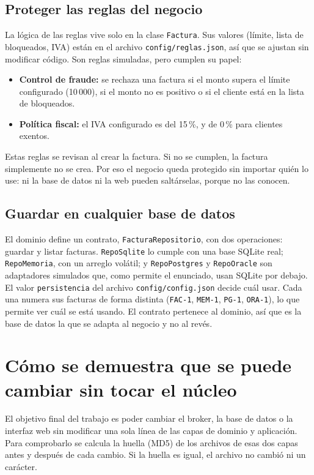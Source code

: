 \documentclass[10.5pt]{article}
\begin{document}
\subsection{Proteger las reglas del negocio}
La lógica de las reglas vive solo en la clase \texttt{Factura}. Sus valores (límite, lista de
bloqueados, IVA) están en el archivo \texttt{config/reglas.json}, así que se ajustan sin
modificar código. Son reglas simuladas, pero cumplen su papel:
\begin{itemize}
\item \textbf{Control de fraude:} se rechaza una factura si el monto supera el límite configurado (10\,000), si el
monto no es positivo o si el cliente está en la lista de bloqueados.
\item \textbf{Política fiscal:} el IVA configurado es del 15\,\%, y de 0\,\% para clientes exentos.
\end{itemize}
Estas reglas se revisan al crear la factura. Si no se cumplen, la factura simplemente no se
crea. Por eso el negocio queda protegido sin importar quién lo use: ni la base de datos ni la web
pueden saltárselas, porque no las conocen.

\subsection{Guardar en cualquier base de datos}
El dominio define un contrato, \texttt{FacturaRepositorio}, con dos operaciones: guardar y
listar facturas. \texttt{RepoSqlite} lo cumple con una base SQLite real; \texttt{RepoMemoria}, con
un arreglo volátil; y \texttt{RepoPostgres} y \texttt{RepoOracle} son adaptadores simulados que,
como permite el enunciado, usan SQLite por debajo. El valor \texttt{persistencia} del archivo
\texttt{config/config.json} decide cuál usar. Cada una numera sus facturas de forma distinta
(\texttt{FAC-1}, \texttt{MEM-1}, \texttt{PG-1}, \texttt{ORA-1}), lo que permite ver cuál se está
usando. El contrato pertenece al dominio, así
que es la base de datos la que se adapta al negocio y no al revés.

\section{Cómo se demuestra que se puede cambiar sin tocar el núcleo}
El objetivo final del trabajo es poder cambiar el broker, la base de datos o la interfaz web sin
modificar una sola línea de las capas de dominio y aplicación. Para comprobarlo se calcula la
huella (MD5) de los archivos de esas dos capas antes y después de cada cambio. Si la huella es
igual, el archivo no cambió ni un carácter.
\end{document}
